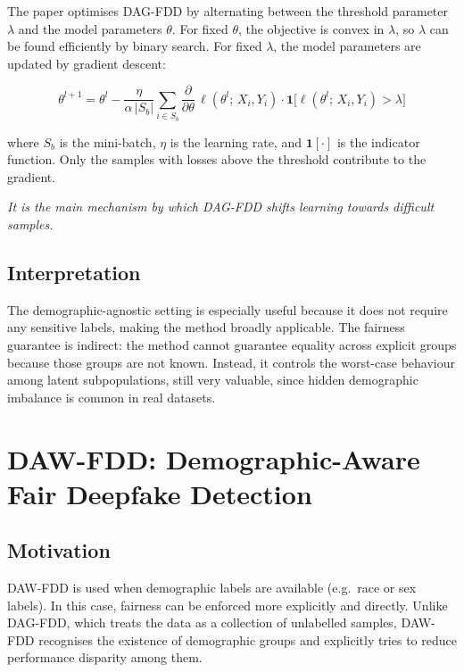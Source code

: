 The paper optimises DAG-FDD by alternating between the threshold parameter $\lambda$ and the model parameters $\theta$. For fixed $\theta$, the objective is convex in $\lambda$, so $\lambda$ can be found efficiently by binary search. For fixed $\lambda$, the model parameters are updated by gradient descent:

\begin{equation}
    \theta^{l+1}
    = \theta^{l}
      - \frac{\eta}{\alpha\,|S_b|}
        \sum_{i \in S_b}
        \frac{\partial}{\partial\theta}\,\ell(\theta^l;\,X_i,Y_i)
        \cdot
        \mathbf{1}\bigl[\ell(\theta^l;\,X_i,Y_i) > \lambda\bigr]
    \label{eq:dag_grad}
\end{equation}

\noindent where $S_b$ is the mini-batch, $\eta$ is the learning rate, and $\mathbf{1}[\cdot]$ is the indicator function. Only the samples with losses above the threshold contribute to the gradient. 

\emph{It is the main mechanism by which DAG-FDD shifts learning towards difficult samples.}

\subsection{Interpretation}
\label{subsec:dag_interp}

The demographic-agnostic setting is especially useful because it does not require any sensitive labels, making the method broadly applicable. The fairness guarantee is indirect: the method cannot guarantee equality across explicit groups because those groups are not known. Instead, it controls the worst-case behaviour among latent subpopulations, still very valuable, since hidden demographic imbalance is common in real datasets.

\section{DAW-FDD: Demographic-Aware Fair Deepfake Detection}
\label{sec:daw_fdd}

\subsection{Motivation}
\label{subsec:daw_motivation}

DAW-FDD is used when demographic labels are available (e.g.\ race or sex labels). In this case, fairness can be enforced more explicitly and directly. Unlike DAG-FDD, which treats the data as a collection of unlabelled samples, DAW-FDD recognises the existence of demographic groups and explicitly tries to reduce performance disparity among them.

